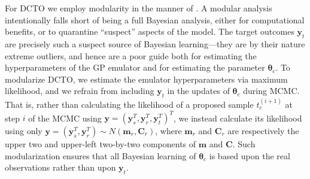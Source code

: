 \documentclass[12pt]{article}
\begin{document}
For DCTO we employ modularity in the manner of \cite{Liu2009}. 
%
A modular analysis intentionally falls short of being a full Bayesian analysis, either for computational benefits, or to quarantine ``suspect'' aspects of the model.
%
The target outcomes $\mathbf y_t$ are precisely such a suspect source of Bayesian learning---they are by their nature extreme outliers, and hence are a poor guide both for estimating the hyperparameters of the GP emulator and for estimating the parameter $\boldsymbol\theta_c$.
%
To modularize DCTO, we estimate the emulator hyperparameters via maximum likelihood, and we refrain from including $\mathbf y_t$ in the updates of $\boldsymbol\theta_c$ during MCMC.
%
That is, rather than calculating the likelihood of a proposed sample $t_c^{(i+1)}$ at step $i$ of the MCMC using $\mathbf y = (\mathbf y_s^T, \mathbf y_r^T, \mathbf y_t^T)^T$, we instead calculate its likelihood using only $\mathbf y = (\mathbf y_s^T, \mathbf y_r^T)\sim N(\mathbf m_r,\mathbf C_r)$, where $\mathbf m_r$ and $\mathbf C_r$ are respectively the upper two and upper-left two-by-two components of $\mathbf m$ and $\mathbf C$.
%
Such modularization ensures that all Bayesian learning of $\boldsymbol\theta_c$ is based upon the real observations rather than upon $\mathbf y_t$.
%

%
\end{document}
